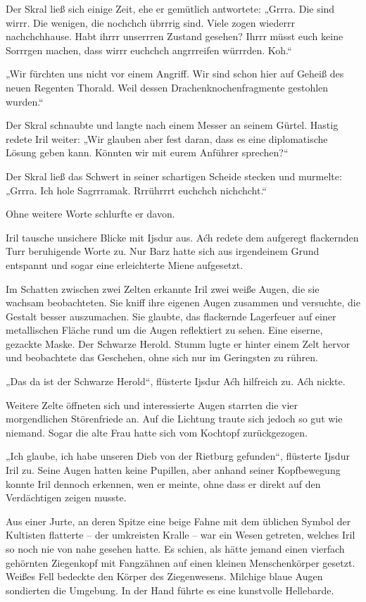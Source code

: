 Der Skral ließ sich einige Zeit, ehe er gemütlich antwortete: „Grrra. Die sind wirrr. Die wenigen, die nochchch übrrrig sind. Viele zogen wiederrr nachchchhause. Habt ihrrr unserrren Zustand gesehen? Ihrrr müsst euch keine Sorrrgen machen, dass wirrr euchchch angrrreifen würrrden. Koh.“

„Wir fürchten uns nicht vor einem Angriff. Wir sind schon hier auf Geheiß des neuen Regenten Thorald. Weil dessen Drachenknochenfragmente gestohlen wurden.“

Der Skral schnaubte und langte nach einem Messer an seinem Gürtel. Hastig redete Iril weiter: „Wir glauben aber fest daran, dass es eine diplomatische Lösung geben kann. Könnten wir mit eurem Anführer sprechen?“

Der Skral ließ das Schwert in seiner schartigen Scheide stecken und murmelte: „Grrra. Ich hole Sagrrramak. Rrrührrrt euchchch nichchcht.“

Ohne weitere Worte schlurfte er davon.

Iril tausche unsichere Blicke mit Ijsdur aus. Aćh redete dem aufgeregt flackernden Turr beruhigende Worte zu. Nur Barz hatte sich aus irgendeinem Grund entspannt und sogar eine erleichterte Miene aufgesetzt.

Im Schatten zwischen zwei Zelten erkannte Iril zwei weiße Augen, die sie wachsam beobachteten. Sie kniff ihre eigenen Augen zusammen und versuchte, die Gestalt besser auszumachen. Sie glaubte, das flackernde Lagerfeuer auf einer metallischen Fläche rund um die Augen reflektiert zu sehen. Eine eiserne, gezackte Maske. Der Schwarze Herold. Stumm lugte er hinter einem Zelt hervor und beobachtete das Geschehen, ohne sich nur im Geringsten zu rühren.

„Das da ist der Schwarze Herold“, flüsterte Ijsdur Aćh hilfreich zu. Aćh nickte.

Weitere Zelte öffneten sich und interessierte Augen starrten die vier morgendlichen Störenfriede an. Auf die Lichtung traute sich jedoch so gut wie niemand. Sogar die alte Frau hatte sich vom Kochtopf zurückgezogen.

„Ich glaube, ich habe unseren Dieb von der Rietburg gefunden“, flüsterte Ijsdur Iril zu. Seine Augen hatten keine Pupillen, aber anhand seiner Kopfbewegung konnte Iril dennoch erkennen, wen er meinte, ohne dass er direkt auf den Verdächtigen zeigen musste.

Aus einer Jurte, an deren Spitze eine beige Fahne mit dem üblichen Symbol der Kultisten flatterte – der umkreisten Kralle – war ein Wesen getreten, welches Iril so noch nie von nahe gesehen hatte. Es schien, als hätte jemand einen vierfach gehörnten Ziegenkopf mit Fangzähnen auf einen kleinen Menschenkörper gesetzt. Weißes Fell bedeckte den Körper des Ziegenwesens. Milchige blaue Augen sondierten die Umgebung. In der Hand führte es eine kunstvolle Hellebarde.

